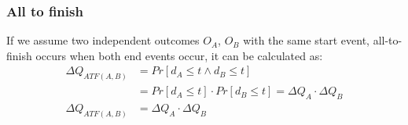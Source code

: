     \subsubsection{All to finish}
        If we assume two independent outcomes $O_A$, $O_B$ with the same start event, all-to-finish occurs when both end events occur, it can be calculated as:
        \begin{equation}
            \begin{split}
                \Delta Q_{ATF(A, B)} &= Pr[d_A \le t \wedge d_B \le t] \\
                & = Pr[d_A \le t] \cdot Pr[d_B \le t] = \Delta Q_A \cdot \Delta Q_B \\
                \Delta Q_{ATF(A, B)} &= \Delta Q_A \cdot \Delta Q_B 
            \end{split}
            \label{eq:atf}
        \end{equation}
        
